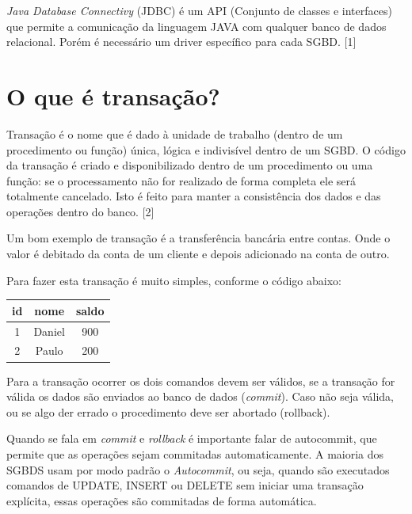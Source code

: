 \documentclass[12pt,a4paper]{article}
\begin{document}
\textit{Java Database Connectivy} (JDBC) é um API (Conjunto de classes e interfaces) que permite a comunicação da linguagem JAVA com qualquer banco de dados relacional. Porém é necessário um driver específico para cada SGBD.  [1]

\section{O que é transação? }

Transação é o nome que é dado à unidade de trabalho (dentro de um procedimento ou função) única, lógica e indivisível dentro de um SGBD. O código da transação é criado e disponibilizado dentro de um procedimento ou uma função: se o processamento não for realizado de forma completa ele será totalmente cancelado. Isto é feito para manter a consistência dos dados e das operações dentro do banco. [2]

Um bom exemplo de transação é a transferência bancária entre contas. Onde o valor é debitado da conta de um cliente e depois adicionado na conta de outro. 

Para fazer esta transação é muito simples, conforme o código abaixo:
\begin{center}



\begin{tabular}{|c|c|c|}
\hline 
id & nome & saldo \\ 
\hline 
1 & Daniel & 900 \\ 
\hline 
2 & Paulo & 200 \\ 
\hline 
\end{tabular} 
\end{center}

 
 
 
Para a transação ocorrer os dois comandos devem ser válidos, se a transação for válida os dados são enviados ao banco de dados (\textit{commit}). Caso não seja válida, ou se algo der errado o procedimento deve ser abortado (rollback). 

Quando se fala em \textit{commit} e \textit{rollback} é importante falar de autocommit, que permite que as operações sejam commitadas automaticamente. A maioria dos SGBDS usam por modo padrão o \textit{Autocommit}, ou seja, quando são executados comandos de UPDATE, INSERT ou DELETE sem iniciar uma transação explícita, essas operações são commitadas de forma automática.

	
\end{document}
